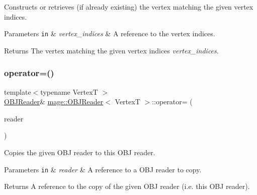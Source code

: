 Constructs or retrieves (if already existing) the vertex matching the given vertex indices.


\begin{DoxyParams}[1]{Parameters}
\mbox{\tt in}  & {\em vertex\+\_\+indices} & A reference to the vertex indices. \\
\hline
\end{DoxyParams}
\begin{DoxyReturn}{Returns}
The vertex matching the given vertex indices {\itshape vertex\+\_\+indices}. 
\end{DoxyReturn}
\hypertarget{classmage_1_1_o_b_j_reader_a62e516060267f828c5aa1a3f23dcf55d}{}\label{classmage_1_1_o_b_j_reader_a62e516060267f828c5aa1a3f23dcf55d} 
\subsubsection{\texorpdfstring{operator=()}{operator=()}\hspace{0.1cm}{\footnotesize\ttfamily [1/2]}}
{\footnotesize\ttfamily template$<$typename VertexT $>$ \\
\hyperlink{classmage_1_1_o_b_j_reader}{O\+B\+J\+Reader}\& \hyperlink{classmage_1_1_o_b_j_reader}{mage\+::\+O\+B\+J\+Reader}$<$ VertexT $>$\+::operator= (\begin{DoxyParamCaption}\item[{const \hyperlink{classmage_1_1_o_b_j_reader}{O\+B\+J\+Reader}$<$ VertexT $>$ \&}]{reader }\end{DoxyParamCaption})\hspace{0.3cm}{\ttfamily [delete]}}

Copies the given O\+BJ reader to this O\+BJ reader.


\begin{DoxyParams}[1]{Parameters}
\mbox{\tt in}  & {\em reader} & A reference to a O\+BJ reader to copy. \\
\hline
\end{DoxyParams}
\begin{DoxyReturn}{Returns}
A reference to the copy of the given O\+BJ reader (i.\+e. this O\+BJ reader). 
\end{DoxyReturn}
\hypertarget{classmage_1_1_o_b_j_reader_ac795c3b1d19ecf38735b76bc5b97fa80}{}\label{classmage_1_1_o_b_j_reader_ac795c3b1d19ecf38735b76bc5b97fa80} 

